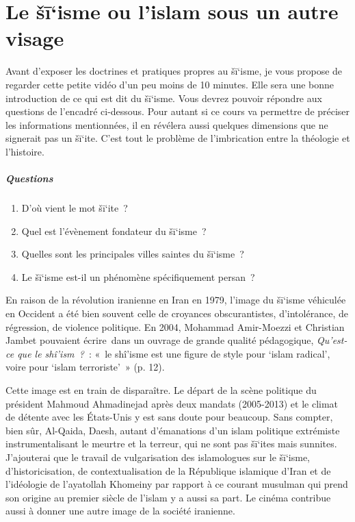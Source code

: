 \chapter{Le šī`isme ou l'islam sous un autre visage}

Avant d'exposer les doctrines et pratiques propres au šī`isme, je vous
propose de regarder cette petite vidéo d'un peu moins de 10 minutes.
Elle sera une bonne introduction de ce qui est dit du šī`isme. Vous
devrez pouvoir répondre aux questions de l'encadré ci-dessous. Pour
autant si ce cours va permettre de préciser les informations
mentionnées, il en révélera aussi quelques dimensions que ne signerait
pas un šī`ite. C'est tout le problème de l'imbrication entre la
théologie et l'histoire.

\paragraph{Questions}

\begin{enumerate}
\def\labelenumi{\arabic{enumi}.}
\item
  D'où vient le mot šī`ite~?
\item
  Quel est l'évènement fondateur du šī`isme~?
\item
  Quelles sont les principales villes saintes du šī`isme~?
\item
  Le šī`isme est-il un phénomène spécifiquement persan~?
\end{enumerate}


En raison de la révolution iranienne en Iran en 1979, l'image du šī`isme
véhiculée en Occident a été bien souvent celle de croyances
obscurantistes, d'intolérance, de régression, de violence politique. En
2004, Mohammad Amir-Moezzi et Christian Jambet pouvaient écrire~dans un
ouvrage de grande qualité pédagogique, \emph{Qu'est-ce que le
shî'ism~?}~: «~le shî'isme est une figure de style pour `islam radical',
voire pour `islam terroriste'~» (p. 12).

Cette image est en train de disparaître. Le départ de la scène politique
du président Mahmoud Ahmadinejad après deux mandats (2005-2013) et le
climat de détente avec les États-Unis y est sans doute pour beaucoup.
Sans compter, bien sûr, Al-Qaida, Daesh, autant d'émanations d'un islam
politique extrémiste instrumentalisant le meurtre et la terreur, qui ne
sont pas šī`ites mais sunnites. J'ajouterai que le travail de
vulgarisation des islamologues sur le šī`isme, d'historicisation, de
contextualisation de la République islamique d'Iran et de l'idéologie de
l'ayatollah Khomeiny par rapport à ce courant musulman qui prend son
origine au premier siècle de l'islam y a aussi sa part. Le cinéma
contribue aussi à donner une autre image de la société iranienne.


